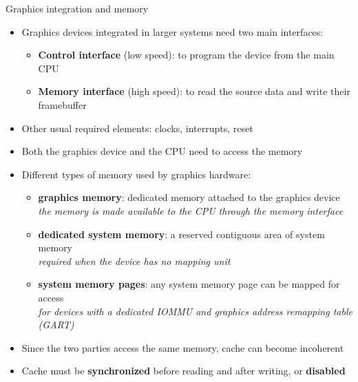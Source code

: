 \begin{frame}{Graphics integration and memory}
  \begin{itemize}
  \item Graphics devices integrated in larger systems need two main interfaces:
    \begin{itemize}
    \item \textbf{Control interface} (low speed): to program the device from the main CPU
    \item \textbf{Memory interface} (high speed): to read the source data and write their framebuffer
    \end{itemize}
  \item Other usual required elements: clocks, interrupts, reset
  \item Both the graphics device and the CPU need to access the memory
  \item Different types of memory used by graphics hardware:
    \begin{itemize}
    \item \textbf{graphics memory}: dedicated memory attached to the graphics device\\
    \textit{the memory is made available to the CPU through the memory interface}
    \item \textbf{dedicated system memory}: a reserved contiguous area of system memory\\
    \textit{required when the device has no mapping unit}
    \item \textbf{system memory pages}: any system memory page can be mapped for access\\
    \textit{for devices with a dedicated IOMMU and graphics address remapping table (GART)}
    \end{itemize}
  \item Since the two parties access the same memory, cache can become incoherent
  \item Cache must be \textbf{synchronized} before reading and after writing, or \textbf{disabled}
  \end{itemize}
\end{frame}

